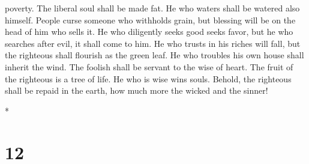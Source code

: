 \begin{paracol}{2}
\begin{otherlanguage}{english}
poverty.  The liberal soul shall be made fat. He who
waters shall be watered also himself.  People curse
someone who withholds grain, but blessing will be on the head of him who
sells it.  He who diligently seeks good seeks favor, but
he who searches after evil, it shall come to him.  He who
trusts in his riches will fall, but the righteous shall flourish as the
green leaf.  He who troubles his own house shall inherit
the wind. The foolish shall be servant to the wise of heart.
 The fruit of the righteous is a tree of life. He who is
wise wins souls.  Behold, the righteous shall be repaid
in the earth, how much more the wicked and the sinner!

\end{otherlanguage}

\switchcolumn[0]*

\hypertarget{section-22}{%
\section{12}\label{section-22}}


\end{paracol}
